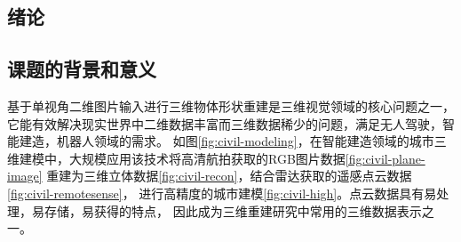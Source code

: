 \documentclass[bachelor, nocolorlinks, printoneside]{seuthesis} %
\begin{document}
\begin{Main} %

\chapter{绪论}

\section{课题的背景和意义}
基于单视角二维图片输入进行三维物体形状重建是三维视觉领域的核心问题之一，它能有效解决现实世界中二维数据丰富而三维数据稀少的问题，满足无人驾驶，智能建造，机器人领域的需求。
如图\ref{fig:civil-modeling}，在智能建造领域的城市三维建模中，大规模应用该技术将高清航拍获取的RGB图片数据\ref{fig:civil-plane-image}
重建为三维立体数据\ref{fig:civil-recon}，结合雷达获取的遥感点云数据\ref{fig:civil-remotesense}，
进行高精度的城市建模\ref{fig:civil-high}。点云数据具有易处理，易存储，易获得的特点，
因此成为三维重建研究中常用的三维数据表示之一。


\end{Main}
\end{document}
